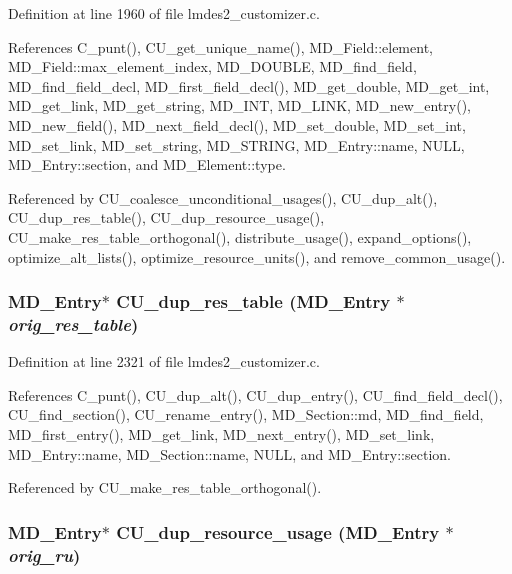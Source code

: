 Definition at line 1960 of file lmdes2\_\-customizer.c.

References C\_\-punt(), CU\_\-get\_\-unique\_\-name(), MD\_\-Field::element, MD\_\-Field::max\_\-element\_\-index, MD\_\-DOUBLE, MD\_\-find\_\-field, MD\_\-find\_\-field\_\-decl, MD\_\-first\_\-field\_\-decl(), MD\_\-get\_\-double, MD\_\-get\_\-int, MD\_\-get\_\-link, MD\_\-get\_\-string, MD\_\-INT, MD\_\-LINK, MD\_\-new\_\-entry(), MD\_\-new\_\-field(), MD\_\-next\_\-field\_\-decl(), MD\_\-set\_\-double, MD\_\-set\_\-int, MD\_\-set\_\-link, MD\_\-set\_\-string, MD\_\-STRING, MD\_\-Entry::name, NULL, MD\_\-Entry::section, and MD\_\-Element::type.

Referenced by CU\_\-coalesce\_\-unconditional\_\-usages(), CU\_\-dup\_\-alt(), CU\_\-dup\_\-res\_\-table(), CU\_\-dup\_\-resource\_\-usage(), CU\_\-make\_\-res\_\-table\_\-orthogonal(), distribute\_\-usage(), expand\_\-options(), optimize\_\-alt\_\-lists(), optimize\_\-resource\_\-units(), and remove\_\-common\_\-usage().
\subsubsection{\setlength{\rightskip}{0pt plus 5cm}\bf{MD\_\-Entry}$\ast$ CU\_\-dup\_\-res\_\-table (\bf{MD\_\-Entry} $\ast$ {\em orig\_\-res\_\-table})}\label{lmdes2__customizer_8c_ba4d5d0af6041b1626b8cd7186b2e73f}




Definition at line 2321 of file lmdes2\_\-customizer.c.

References C\_\-punt(), CU\_\-dup\_\-alt(), CU\_\-dup\_\-entry(), CU\_\-find\_\-field\_\-decl(), CU\_\-find\_\-section(), CU\_\-rename\_\-entry(), MD\_\-Section::md, MD\_\-find\_\-field, MD\_\-first\_\-entry(), MD\_\-get\_\-link, MD\_\-next\_\-entry(), MD\_\-set\_\-link, MD\_\-Entry::name, MD\_\-Section::name, NULL, and MD\_\-Entry::section.

Referenced by CU\_\-make\_\-res\_\-table\_\-orthogonal().
\subsubsection{\setlength{\rightskip}{0pt plus 5cm}\bf{MD\_\-Entry}$\ast$ CU\_\-dup\_\-resource\_\-usage (\bf{MD\_\-Entry} $\ast$ {\em orig\_\-ru})}\label{lmdes2__customizer_8c_5908c785db2a738c076ba133610e281f}




